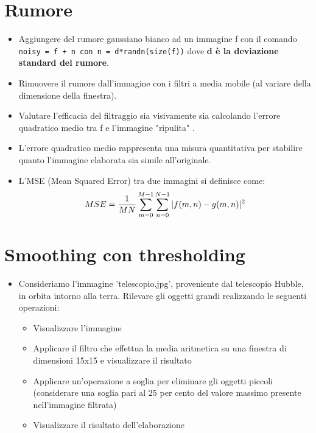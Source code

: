 \section{Rumore}
\begin{itemize}
	\item Aggiungere del rumore gaussiano bianco ad un immagine f con il comando	\verb|noisy = f + n con n = d*randn(size(f))| dove \textbf{d è la deviazione standard del rumore}.
	
	\item Rimuovere il rumore dall'immagine con i filtri a media mobile (al variare della dimensione della finestra).
	
	\item Valutare l'efficacia del filtraggio sia visivamente sia calcolando l'errore quadratico medio tra f e l'immagine "ripulita" .
	
	\item L’errore quadratico medio rappresenta una misura quantitativa per stabilire quanto l'immagine elaborata sia simile all'originale.
	
	\item L'MSE (Mean Squared Error) tra due immagini si definisce come:
	$$
	MSE = {1 \over MN} \sum_{m=0}^{M-1} \sum_{n=0}^{N-1} |f(m, n) - g(m, n)|^2
	$$
\end{itemize}

\section{Smoothing con thresholding}

\begin{itemize}
	\item Consideriamo l'immagine 'telescopio.jpg', proveniente dal telescopio Hubble, in orbita intorno alla terra. Rilevare gli oggetti grandi realizzando le seguenti operazioni:
	\begin{itemize}
		\item Visualizzare l'immagine
		\item Applicare il filtro che effettua la media aritmetica su una finestra di dimensioni 15x15 e visualizzare il risultato
		\item Applicare un'operazione a soglia per eliminare gli oggetti piccoli (considerare una soglia pari al 25 per cento del valore massimo presente nell'immagine filtrata)
		\item Visualizzare il risultato dell'elaborazione
		
	\end{itemize}
\end{itemize}